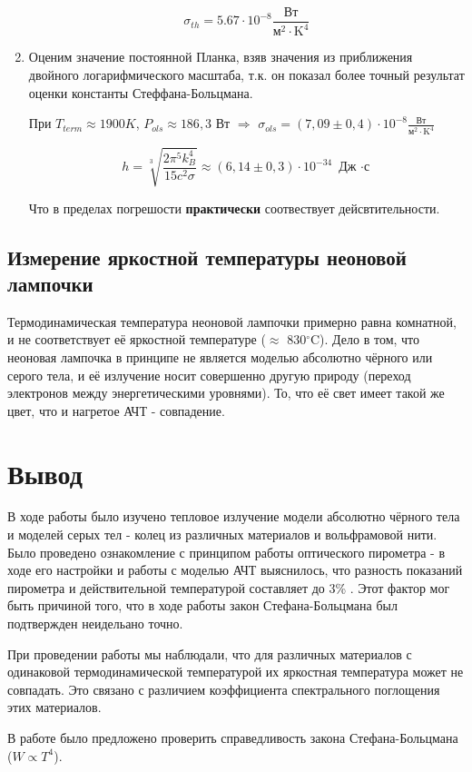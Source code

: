 \documentclass[15pt,a5paper,reqno]{article}
\begin{document}
\begin{enumerate}
\[  \sigma_{th} = 5.67 \cdot 10^{-8}  \frac{\text{Вт}}{\text{м}^2 \cdot \text{K}^{4}} \]
\item Оценим значение постоянной Планка, взяв значения из приближения двойного логарифмического масштаба, т.к. он показал более точный результат оценки константы Стеффана-Больцмана.


При $T_{term} \approx 1900 K$, $P_{ols} \approx 186,3$ Вт $\Rightarrow$ $\sigma_{ols} = (7,09 \pm 0,4) \cdot 10^{-8} \frac{\text{Вт}}{\text{м}^2 \cdot \text{K}^{4}}   $ 

\[ h = \sqrt[3]{\frac{2 \pi^5 k_B^4}{15 c^2 \sigma}} \approx  (6,14 \pm 0,3) \cdot 10^{-34}  \text{ Дж $\cdot$с} \]

Что в пределах погрешости \textbf{практически} соотвествует дейсвтительности.

\end{enumerate}

\subsection{Измерение яркостной температуры неоновой лампочки}
Термодинамическая температура неоновой лампочки примерно равна комнатной, и не соответствует её яркостной температуре ($\approx$ 830$^{\circ}$C). Дело в том, что неоновая лампочка в принципе не является моделью абсолютно чёрного или серого тела, и её излучение носит совершенно другую природу (переход электронов между энергетическими уровнями). То, что её свет имеет такой же цвет, что и нагретое АЧТ - совпадение.

\section{Вывод}
В ходе работы было изучено тепловое излучение модели абсолютно чёрного тела и моделей серых тел - колец из различных материалов и вольфрамовой нити. Было проведено ознакомление с принципом работы оптического пирометра - в ходе его настройки и работы с моделью АЧТ выяснилось, что разность показаний пирометра и действительной температурой составляет до 3\% . 
Этот фактор мог быть причиной того, что в ходе работы закон Стефана-Больцмана был подтвержден неидельано точно. \par
При проведении работы мы наблюдали, что для различных материалов с одинаковой термодинамической температурой их яркостная температура может не совпадать. Это связано с различием коэффициента спектрального поглощения этих материалов. \par
В работе было предложено проверить справедливость закона Стефана-Больцмана ($W \propto T^4$).
\end{document}
